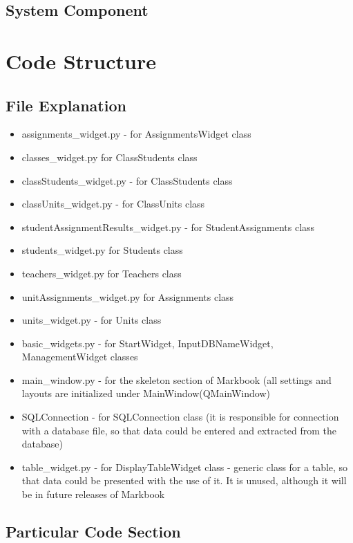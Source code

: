 \subsection{System Component}
\section{Code Structure}
\subsection{File Explanation}

\begin{itemize}
    \item assignments_widget.py - for AssignmentsWidget class
    \item classes_widget.py for ClassStudents class
    \item classStudents_widget.py - for ClassStudents class
    \item classUnits_widget.py - for ClassUnits class
    \item studentAssignmentResults_widget.py - for StudentAssignments class
    \item students_widget.py for Students class
    \item teachers_widget.py for Teachers class
    \item unitAssignments_widget.py for Assignments class
    \item units_widget.py - for Units class
    \item basic_widgets.py - for StartWidget, InputDBNameWidget, ManagementWidget classes
    \item main_window.py - for the skeleton section of Markbook (all settings and layouts are initialized under MainWindow(QMainWindow)
    \item SQLConnection - for SQLConnection class (it is responsible for connection with a database file, so that data could be entered and extracted from the database)
    \item table_widget.py - for DisplayTableWidget class - generic class for a table, so that data could be presented with the use of it. It is unused, although it will be in future releases of Markbook
\end{itemize}


\subsection{Particular Code Section}

